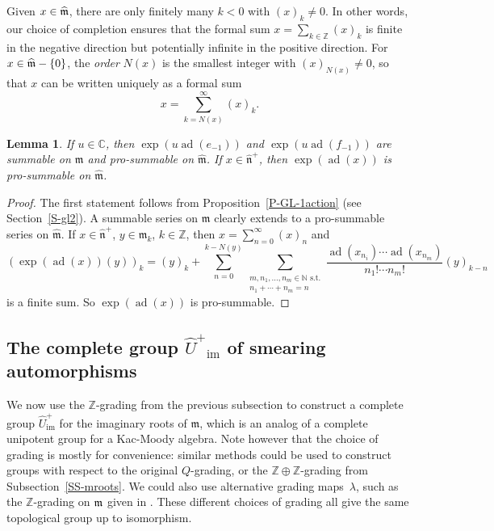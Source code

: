 \documentclass[11pt,letterpaper]{amsart}
\newcounter{thecounter}
\numberwithin{thecounter}{section}
\newtheorem{lemma}[thecounter]{Lemma}
\theoremstyle{definition}
\DeclareMathOperator{\ad}{ad}
\DeclareMathOperator{\im}{{im}}
\newcommand{\Z}{{\mathbb Z}}
\newcommand{\C}{{\mathbb C}}
\newcommand{\N}{{\mathbb N}}
\newcommand{\Uhp}{{\widehat{U}^+}}
\newcommand{\Uhimp}{{\widehat{U}_{\im}^+}}
\newcommand{\m}{{\mathfrak{m}}}
\newcommand{\n}{{\mathfrak{n}}}
\begin{document}
Given $x\in\widehat{\frak m}$, there are only
finitely many $k<0$ with $(x)_k\ne 0$.
In other words, our choice of completion ensures that the formal sum  $x=\sum_{k\in\Z}(x)_k$ is finite in the negative direction but potentially infinite in the positive direction.
For $x\in\widehat{\frak m}-\{0\}$, the \emph{order} $N(x)$ is the smallest integer with $(x)_{N(x)}\ne0$, so that $x$  can be written uniquely as a  formal sum
$$x=\sum_{k=N(x)}^\infty (x)_k.$$

\begin{lemma}\label{L-expad}
If $u\in\C$, then
$\exp\left(u\ad\left(e_{-1} \right) \right)$ and $\exp\left(u\ad\left(f_{-1} \right) \right)$ are summable on $\mathfrak{m}$ and pro-summable on 
$\widehat{\mathfrak{m}}$.
If $x\in\widehat{\mathfrak{n}}^+$, then 
$\exp(\ad(x))$ is pro-summable on $\widehat{\mathfrak{m}}$.
\end{lemma}
\begin{proof}
The first statement follows from Proposition~\ref{P-GL-1action} (see Section~\ref{S-gl2}).
A summable series on $\mathfrak{m}$
clearly extends to a pro-summable series on $\widehat{\mathfrak{m}}$.
If $x\in\widehat{\mathfrak{n}}^+$, $y\in \mathfrak{m}_k$, $k\in\Z$, then $x=\sum_{n=0}^\infty (x)_n$ and
$$\left(\exp\left(\ad(x) \right)(y) \right)_k  = (y)_k+\sum_{n=0}^{k-N(y)} \sum_{\substack{m,n_1,\dots,n_m\in \N\text{ s.t.}\\n_1+\cdots+n_m=n}}
\frac{\ad\left(x_{n_i} \right)\cdots\ad\left(x_{n_m} \right)}{n_1!\cdots n_m!} 
 \left(y \right)_{k-n}$$
 is a finite sum. So $ \exp(\ad(x))$ is pro-summable. 
\end{proof}




\subsection{The complete group $\Uhp_{\im}$ of smearing automorphisms}\label{SS-Uhat}
We now use the $\Z$-grading from the previous subsection to construct a complete  group $\Uhimp $ for the imaginary roots of $\m$, 
which is an analog of a complete unipotent group for a Kac-Moody algebra.
Note however that the choice of grading is mostly for convenience: 
similar methods could be used to construct groups with respect to the original $Q$-grading, or the $\Z\oplus\Z$-grading from Subsection~\ref{SS-mroots}.
We could also use alternative grading maps~$\lambda$, such as the 
$\Z$-grading on $\frak m$ given in \cite{BoInvent}.
These different choices of grading all give the same topological group up to isomorphism.
\end{document}
